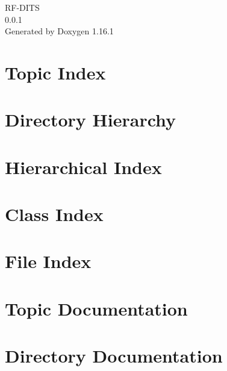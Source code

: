 \documentclass[twoside]{book}
\newcommand{\+}{\discretionary{\mbox{\scriptsize$\hookleftarrow$}}{}{}}
\newcommand{\clearemptydoublepage}{%
    \newpage{\pagestyle{empty}\cleardoublepage}%
  }
\begin{document}
  \raggedbottom
    \hypersetup{pageanchor=false,
                bookmarksnumbered=true,
                pdfencoding=unicode
               }
  \begin{titlepage}
  \vspace*{7cm}
  \begin{center}%
  {\Large RF-\/\+DITS}\\
  [1ex]\large 0.\+0.\+1 \\
  \vspace*{1cm}
  {\large Generated by Doxygen 1.16.1}\\
  \end{center}
  \end{titlepage}
  \clearemptydoublepage
  \tableofcontents
  \clearemptydoublepage
  \hypersetup{pageanchor=true}

\chapter{Topic Index}

\chapter{Directory Hierarchy}

\chapter{Hierarchical Index}

\chapter{Class Index}

\chapter{File Index}

\chapter{Topic Documentation}









\chapter{Directory Documentation}

\end{document}
